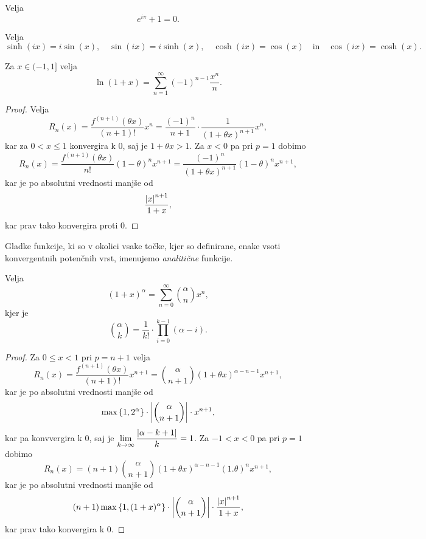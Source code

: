 \documentclass[12pt, a4paper]{article}
\begin{document}
\begin{posledica}
Velja
\[
e^{i\pi}+1=0.
\]
\end{posledica}

\begin{opomba}
Velja
\[
\sinh(ix)=i\sin(x),\quad \sin(ix)=i\sinh(x),\quad \cosh(ix)=\cos(x)\quad\text{in}\quad \cos(ix)=\cosh(x).
\]
\end{opomba}

\begin{trditev}
Za $x\in(-1,1]$ velja
\[
\ln(1+x)=\sum_{n=1}^\infty (-1)^{n-1}\frac{x^n}{n}.
\]
\end{trditev}

\begin{proof}
Velja
\[
R_n(x)=\frac{f^{(n+1)}(\theta x)}{(n+1)!}x^n=\frac{(-1)^n}{n+1}\cdot\frac{1}{(1+\theta x)^{n+1}}x^n,
\]
kar za $0<x\leq 1$ konvergira k $0$, saj je $1+\theta x>1$. Za $x<0$ pa pri $p=1$ dobimo
\[
R_n(x)=\frac{f^{(n+1)}(\theta x)}{n!}(1-\theta)^n x^{n+1}=\frac{(-1)^n}{(1+\theta x)^{n+1}}(1-\theta)^n x^{n+1},
\]
kar je po absolutni vrednosti manjše od
\[
\frac{\left\lvert x\right\rvert^{n+1}}{1+x},
\]
kar prav tako konvergira proti $0$.
\end{proof}

\begin{opomba}
Gladke funkcije, ki so v okolici vsake točke, kjer so definirane, enake vsoti konvergentnih potenčnih vrst, imenujemo \emph{analitične} funkcije.
\end{opomba}

\begin{trditev}
Velja
\[
(1+x)^\alpha=\sum_{n=0}^\infty\binom{\alpha}{n}x^n,
\]
kjer je 
\[
\binom{\alpha}{k}=\frac{1}{k!}\cdot\prod_{i=0}^{k-1}(\alpha-i).
\]
\end{trditev}

\begin{proof}
Za $0\leq x<1$ pri $p=n+1$ velja
\[
R_n(x)=\frac{f^{(n+1)}(\theta x)}{(n+1)!}x^{n+1}=\binom{\alpha}{n+1}(1+\theta x)^{\alpha-n-1}x^{n+1},
\]
kar je po absolutni vrednosti manjše od
\[
\max\left\{1,2^\alpha\right\}\cdot\left\lvert \binom{\alpha}{n+1}\right\rvert\cdot x^{n+1},
\]
kar pa konvvergira k $0$, saj je $\displaystyle\lim_{k\to\infty}\frac{\left\lvert \alpha-k+1\right\rvert}{k}=1$. Za $-1<x<0$ pa pri $p=1$ dobimo
\[
R_n(x)=(n+1)\binom{\alpha}{n+1}(1+\theta x)^{\alpha-n-1}(1.\theta)^nx^{n+1},
\]
kar je po absolutni vrednosti manjše od
\[
(n+1)\max\left\{1,(1+x)^\alpha\right\}\cdot\left\lvert \binom{\alpha}{n+1}\right\rvert\cdot\frac{\left\lvert x\right\rvert^{n+1}}{1+x},
\]
kar prav tako konvergira k $0$.
\end{proof}
\end{document}
